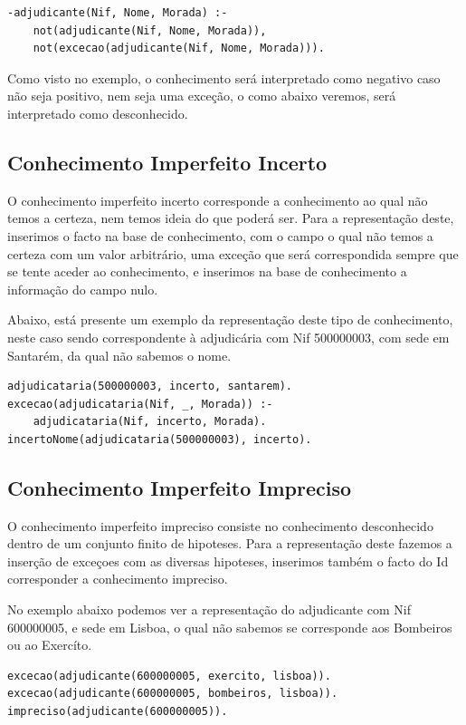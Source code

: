 \documentclass[a4paper]{report}
\begin{document}
\begin{verbatim}
-adjudicante(Nif, Nome, Morada) :-
    not(adjudicante(Nif, Nome, Morada)),
    not(excecao(adjudicante(Nif, Nome, Morada))).
\end{verbatim}

Como visto no exemplo, o conhecimento será interpretado como negativo caso não
seja positivo, nem seja uma exceção, o como abaixo veremos, será interpretado
como desconhecido.

\subsection{Conhecimento Imperfeito Incerto}
O conhecimento imperfeito incerto corresponde a conhecimento ao qual não temos a
certeza, nem temos ideia do que poderá ser. Para a representação deste,
inserimos o facto na base de conhecimento, com o campo o qual não temos a
certeza com um valor arbitrário, uma exceção que será correspondida sempre que
se tente aceder ao conhecimento, e inserimos na base de conhecimento a
informação do campo nulo.

Abaixo, está presente um exemplo da representação deste tipo de conhecimento,
neste caso sendo correspondente à adjudicária com Nif 500000003, com sede em
Santarém, da qual não sabemos o nome.
\begin{verbatim}
adjudicataria(500000003, incerto, santarem).
excecao(adjudicataria(Nif, _, Morada)) :-
    adjudicataria(Nif, incerto, Morada).
incertoNome(adjudicataria(500000003), incerto).
\end{verbatim}

\subsection{Conhecimento Imperfeito Impreciso}
O conhecimento imperfeito impreciso consiste no conhecimento desconhecido dentro
de um conjunto finito de hipoteses. Para a representação deste fazemos a
inserção de exceçoes com as diversas hipoteses, inserimos também o facto do Id
corresponder a conhecimento impreciso.

No exemplo abaixo podemos ver a representação do adjudicante com Nif 600000005,
e sede em Lisboa, o qual não sabemos se corresponde aos Bombeiros ou ao
Exercíto.

\begin{verbatim}
excecao(adjudicante(600000005, exercito, lisboa)).
excecao(adjudicante(600000005, bombeiros, lisboa)).
impreciso(adjudicante(600000005)).
\end{verbatim}
\end{document}
